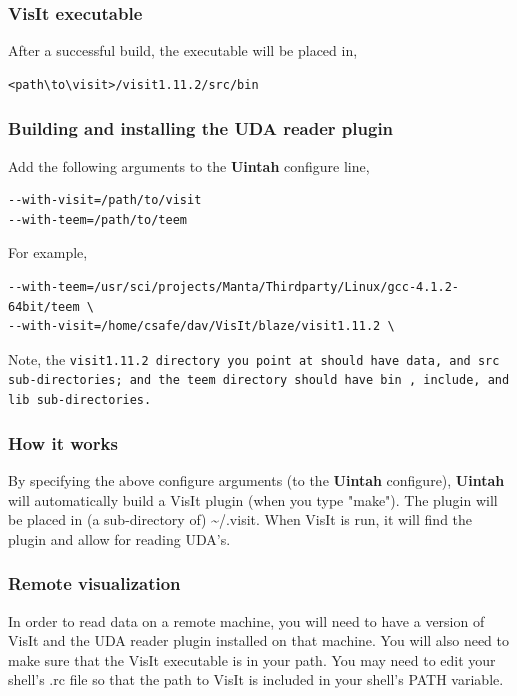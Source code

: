 \documentclass[12pt]{article}
\begin{document}
\subsubsection{VisIt executable}
\label{sec:VisItExecutable}

After a successful build, the executable will be placed in,

\begin{verbatim}
<path\to\visit>/visit1.11.2/src/bin
\end{verbatim}

\subsubsection{Building and installing the UDA reader plugin}
\label{sec:BuildingAndInstallingUDAPlugin}

Add the following arguments to the \textbf{Uintah} configure line,

\begin{verbatim}
--with-visit=/path/to/visit 
--with-teem=/path/to/teem
\end{verbatim}

For example,

\begin{verbatim}
--with-teem=/usr/sci/projects/Manta/Thirdparty/Linux/gcc-4.1.2-64bit/teem \
--with-visit=/home/csafe/dav/VisIt/blaze/visit1.11.2 \
\end{verbatim}

Note, the \tt visit1.11.2 \normalfont directory you point at should
have \tt data\normalfont , and \tt src \normalfont sub-directories;
and the \tt teem \normalfont directory should have \tt bin\normalfont
, \tt include\normalfont , and \tt lib \normalfont sub-directories.

\subsubsection{How it works}
By specifying the above configure arguments (to the \textbf{Uintah}
configure), \textbf{Uintah} will automatically build a VisIt plugin
(when you type "make"). The plugin will be placed in (a sub-directory
of) \textasciitilde/.visit. When VisIt is run, it will find the plugin
and allow for reading UDA's.

\subsubsection{Remote visualization}
In order to read data on a remote machine, you will need to have a
version of VisIt and the UDA reader plugin installed on that
machine. You will also need to make sure that the VisIt executable is
in your path. You may need to edit your shell's .rc file so that the
path to VisIt is included in your shell's PATH variable.
\end{document}
